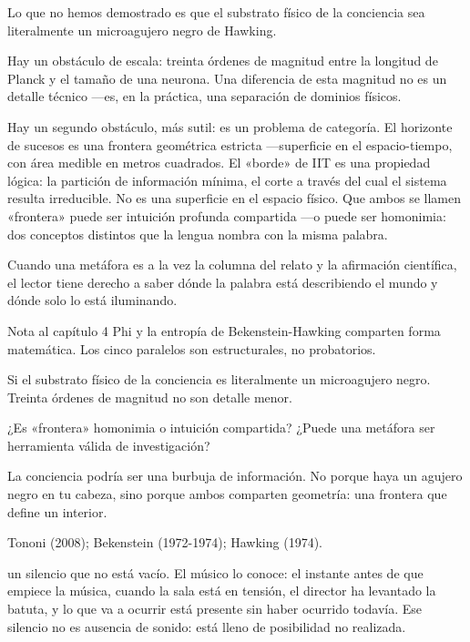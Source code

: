 Lo que no hemos demostrado es que el substrato físico de la conciencia sea literalmente un microagujero negro de Hawking.

Hay un obstáculo de escala: treinta órdenes de magnitud entre la longitud de Planck y el tamaño de una neurona. Una diferencia de esta magnitud no es un detalle técnico —es, en la práctica, una separación de dominios físicos.

Hay un segundo obstáculo, más sutil: es un problema de categoría. El horizonte de sucesos es una frontera geométrica estricta —superficie en el espacio-tiempo, con área medible en metros cuadrados. El «borde» de IIT es una propiedad lógica: la partición de información mínima, el corte a través del cual el sistema resulta irreducible. No es una superficie en el espacio físico. Que ambos se llamen «frontera» puede ser intuición profunda compartida —o puede ser homonimia: dos conceptos distintos que la lengua nombra con la misma palabra.

Cuando una metáfora es a la vez la columna del relato y la afirmación científica, el lector tiene derecho a saber dónde la palabra está describiendo el mundo y dónde solo lo está iluminando.

\begin{notacap}{Nota al capítulo 4}
 Phi y la entropía de Bekenstein-Hawking comparten forma matemática. Los cinco paralelos son estructurales, no probatorios.

 Si el substrato físico de la conciencia es literalmente un microagujero negro. Treinta órdenes de magnitud no son detalle menor.

 ¿Es «frontera» homonimia o intuición compartida? ¿Puede una metáfora ser herramienta válida de investigación?

 La conciencia podría ser una burbuja de información. No porque haya un agujero negro en tu cabeza, sino porque ambos comparten geometría: una frontera que define un interior.

 Tononi (2008); Bekenstein (1972-1974); Hawking (1974).
\end{notacap}
\noindent {} un silencio que no está vacío. El músico lo conoce: el instante antes de que empiece la música, cuando la sala está en tensión, el director ha levantado la batuta, y lo que va a ocurrir está presente sin haber ocurrido todavía. Ese silencio no es ausencia de sonido: está lleno de posibilidad no realizada.

